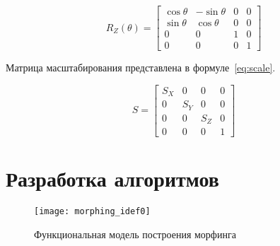 \begin{equation}
    \label{eq:rot_z}
    R_Z(\theta) =
    \begin{bmatrix}
        \cos\theta & -\sin\theta & 0 & 0 \\
        \sin\theta & \cos\theta & 0 & 0 \\
        0 & 0 & 1 & 0 \\
        0 & 0 & 0 & 1
    \end{bmatrix}
\end{equation}

Матрица масштабирования представлена в формуле~\eqref{eq:scale}.

\begin{equation}
    \label{eq:scale}
    S =
    \begin{bmatrix}
        S_X & 0 & 0 & 0 \\
        0 & S_Y & 0 & 0 \\
        0 & 0 & S_Z & 0 \\
        0 & 0 & 0 & 1
    \end{bmatrix}
\end{equation}

%

\section{Разработка алгоритмов}

\begin{figure}[H]
    \label{fig:morphig_idef0}
    \texttt{[image: morphing\_idef0]}
    \caption{Функциональная модель построения морфинга}
\end{figure}

